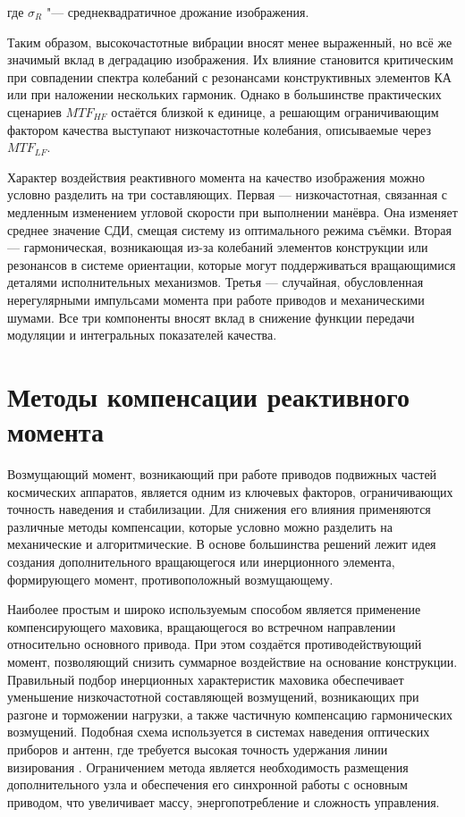 где \(\sigma_R\) "--- среднеквадратичное дрожание изображения.


Таким образом, высокочастотные вибрации вносят менее выраженный, но всё же значимый вклад в деградацию изображения. Их влияние становится критическим при совпадении спектра колебаний с резонансами конструктивных элементов КА или при наложении нескольких гармоник. Однако в большинстве практических сценариев $MTF_{HF}$ остаётся близкой к единице, а решающим ограничивающим фактором качества выступают низкочастотные колебания, описываемые через $MTF_{LF}$.

Характер воздействия реактивного момента на качество изображения можно условно разделить на три составляющих. Первая — низкочастотная, связанная с медленным изменением угловой скорости при выполнении манёвра. Она изменяет среднее значение СДИ, смещая систему из оптимального режима съёмки. Вторая — гармоническая, возникающая из-за колебаний элементов конструкции или резонансов в системе ориентации, которые могут поддерживаться вращающимися деталями исполнительных механизмов. Третья — случайная, обусловленная нерегулярными импульсами момента при работе приводов и механическими шумами. Все три компоненты вносят вклад в снижение функции передачи модуляции и интегральных показателей качества.

\section{Методы компенсации реактивного момента}
Возмущающий момент, возникающий при работе приводов подвижных частей космических аппаратов, является одним из ключевых факторов, ограничивающих точность наведения и стабилизации. Для снижения его влияния применяются различные методы компенсации, которые условно можно разделить на механические и алгоритмические. В основе большинства решений лежит идея создания дополнительного вращающегося или инерционного элемента, формирующего момент, противоположный возмущающему.

Наиболее простым и широко используемым способом является применение компенсирующего маховика, вращающегося во встречном направлении относительно основного привода. При этом создаётся противодействующий момент, позволяющий снизить суммарное воздействие на основание конструкции. Правильный подбор инерционных характеристик маховика обеспечивает уменьшение низкочастотной составляющей возмущений, возникающих при разгоне и торможении нагрузки, а также частичную компенсацию гармонических возмущений. Подобная схема используется в системах наведения оптических приборов и антенн, где требуется высокая точность удержания линии визирования \cite{montenbruck2002satellite}. Ограничением метода является необходимость размещения дополнительного узла и обеспечения его синхронной работы с основным приводом, что увеличивает массу, энергопотребление и сложность управления.

